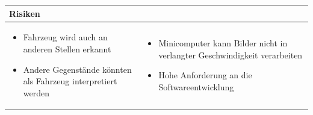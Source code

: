 \begin{table}[h]
\begin{tabular}{p{}p{}}


\textbf{Risiken} & \\ \hline
	 
\begin{itemize}
\item Fahrzeug wird auch an anderen Stellen erkannt
\item Andere Gegenstände könnten als Fahrzeug interpretiert werden

\end{itemize}
&
\begin{itemize}
\item Minicomputer kann Bilder nicht in verlangter Geschwindigkeit verarbeiten
\item Hohe Anforderung an die Softwareentwicklung
\end{itemize}
 
\end{tabular}
\end{table}

\pagebreak